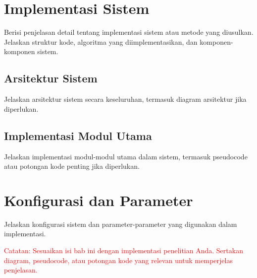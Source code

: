 \section{Implementasi Sistem}

Berisi penjelasan detail tentang implementasi sistem atau metode yang diusulkan. Jelaskan struktur kode, algoritma yang diimplementasikan, dan komponen-komponen sistem.

\subsection{Arsitektur Sistem}

Jelaskan arsitektur sistem secara keseluruhan, termasuk diagram arsitektur jika diperlukan.

\subsection{Implementasi Modul Utama}

Jelaskan implementasi modul-modul utama dalam sistem, termasuk pseudocode atau potongan kode penting jika diperlukan.

\section{Konfigurasi dan Parameter}

Jelaskan konfigurasi sistem dan parameter-parameter yang digunakan dalam implementasi.

\textcolor{red}{Catatan: Sesuaikan isi bab ini dengan implementasi penelitian Anda. Sertakan diagram, pseudocode, atau potongan kode yang relevan untuk memperjelas penjelasan.}
